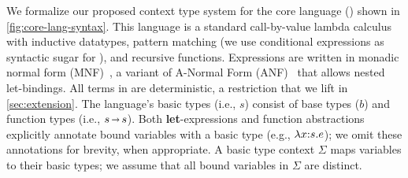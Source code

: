 We formalize our proposed context type system for the core language
(\langname{}) shown in \autoref{fig:core-lang-syntax}.  This language
is a standard call-by-value lambda calculus with inductive datatypes,
pattern matching (we use conditional expressions as syntactic sugar
for ), and recursive functions. Expressions are written in
monadic normal form (MNF)~\cite{JO94}, a variant of A-Normal Form
(ANF)~\cite{FSDF93} that allows nested let-bindings. All terms in
\langname{} are deterministic, a restriction that we lift in
\autoref{sec:extension}.  The language's basic types (i.e., $s$)
consist of base types ($b$) and function types (i.e., $s{\,\shortrightarrow\,}
s$). Both \textbf{let}-expressions and function abstractions
explicitly annotate bound variables with a basic type (e.g.,
$\lambda {x}{:}{s}.{e}$); we omit these annotations for brevity, when
appropriate.  A basic type context $\Sigma$ maps variables to their
basic types; we assume that all bound variables in $\Sigma$ are
distinct.

